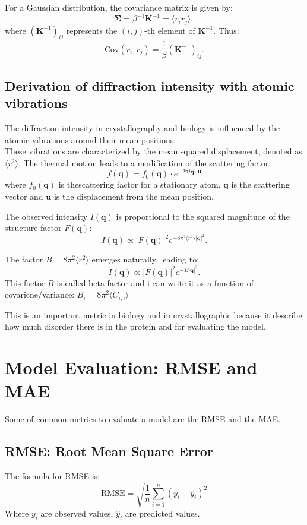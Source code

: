 \documentclass[English, Lau, oneside]{sapthesis}
\begin{document}
For a Gaussian distribution, the covariance matrix is given by:
\begin{equation}
    \bm{\Sigma} = \beta^{-1} \mathbf{K}^{-1} = \langle r_i r_j \rangle,
\end{equation}
where \((\mathbf{K}^{-1})_{ij}\) represents the \((i,j)\)-th element of \(\mathbf{K}^{-1}\). Thus:
\begin{equation}
    \text{Cov}(r_i, r_j) = \frac{1}{\beta} (\mathbf{K}^{-1})_{ij}.
\end{equation}

\subsection{Derivation of diffraction intensity with atomic vibrations}
\noindent The diffraction intensity in crystallography and biology is influenced by the atomic vibrations around their mean positions.\\
These vibrations are characterized by the mean squared displacement, denoted as $\langle r^2 \rangle$.
The thermal motion leads to a modification of the scattering factor:
\[
f(\mathbf{q}) = f_0(\mathbf{q}) \cdot e^{-2\pi i \mathbf{q} \cdot \mathbf{u}}
\]
where $f_0(\mathbf{q})$ is thescattering factor for a stationary atom, $\mathbf{q}$ is the scattering vector and $\mathbf{u}$ is the displacement from the mean position.


The observed intensity $I(\mathbf{q})$ is proportional to the squared magnitude of the structure factor $F(\mathbf{q})$:
\[
I(\mathbf{q}) \propto |F(\mathbf{q})|^2 e^{-8\pi^2 \langle r^2 \rangle |\mathbf{q}|^2}.
\]

The factor $B = 8\pi^2 \langle r^2 \rangle$ emerges naturally, leading to:
\[
I(\mathbf{q}) \propto |F(\mathbf{q})|^2 e^{-B |\mathbf{q}|^2}.
\]
This factor $B$ is called beta-factor and i can write it as a function of covaricne/variance:
$B_i = 8\pi^2 \langle C_{i,i} \rangle$ 

This is an important metric in biology and in crystallographic because it describe how much disorder there is in the protein and for evaluating the model.


\section{Model Evaluation: RMSE and MAE }\label{sec:Evaluation}
Some of common metrics to evaluate a model are the RMSE and the MAE. 
\subsection{RMSE: Root Mean Square Error}
\noindent The formula for RMSE is:
\[
\text{RMSE} = \sqrt{\frac{1}{n} \sum_{i=1}^n (y_i - \hat{y}_i)^2}
\]
Where \(y_i\) are observed values, \(\hat{y}_i\) are predicted values.
\end{document}

